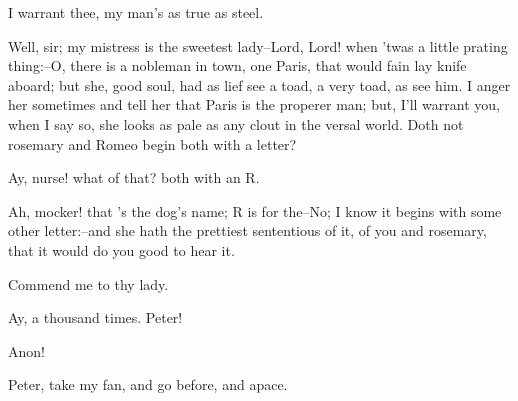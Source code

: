 \begin{speech}
I warrant thee, my man's as true as steel. \\
\end{speech}
\begin{speech}
Well, sir; my mistress is the sweetest
lady--Lord, Lord! when 'twas a little
prating thing:--O, there is a nobleman in
town, one Paris, that would fain lay knife
aboard; but she, good soul, had as lief see a
toad, a very toad, as see him.   I anger her
sometimes and tell her that Paris is the properer
man; but, I'll warrant you, when I say
so, she looks as pale as any clout in the versal
world. Doth not rosemary and Romeo begin
both with a letter?
\end{speech}
\begin{speech}
Ay, nurse! what of that? both with an R.
\end{speech}
\begin{speech}
Ah, mocker! that 's the dog's name;
R is for the--No; I know it begins with some
other letter:--and she hath the prettiest sententious
of it, of you and rosemary, that it
would do you good to hear it.
\end{speech}
\begin{speech}
Commend me to thy lady.
\end{speech}
\begin{speech}
Ay, a thousand times. Peter!
\end{speech}
\begin{speech}
Anon!
\end{speech}
\begin{speech}
Peter, take my fan, and go before,
and apace. 
\end{speech}


